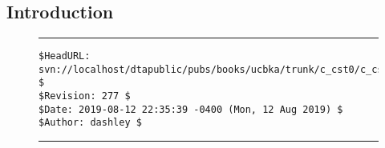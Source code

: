 
\chapter{\ccstzerolongtitle{}}

\label{ccst0}


\section{Introduction}



\noindent\begin{figure}[!b]
\noindent\rule[-0.25in]{\textwidth}{1pt}
\begin{tiny}
\begin{verbatim}
$HeadURL: svn://localhost/dtapublic/pubs/books/ucbka/trunk/c_cst0/c_cst0.tex $
$Revision: 277 $
$Date: 2019-08-12 22:35:39 -0400 (Mon, 12 Aug 2019) $
$Author: dashley $
\end{verbatim}
\end{tiny}
\noindent\rule[0.25in]{\textwidth}{1pt}
\end{figure}
%
